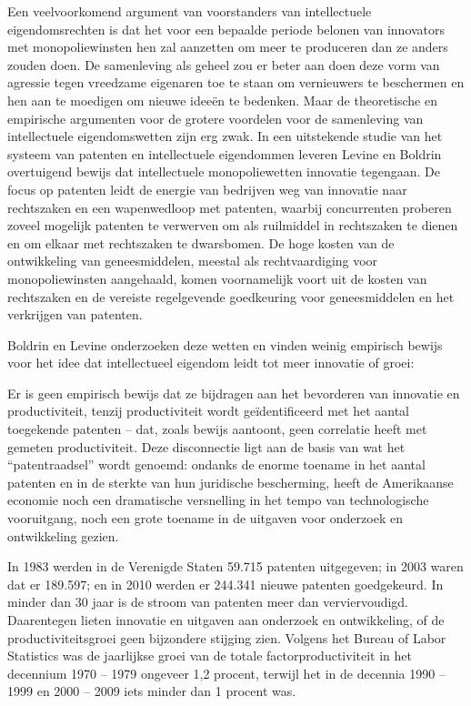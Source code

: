Een veelvoorkomend argument van voorstanders van intellectuele eigendomsrechten is dat het voor een bepaalde periode belonen van innovators met monopoliewinsten hen zal aanzetten om meer te produceren dan ze anders zouden doen. De samenleving als geheel zou er beter aan doen deze vorm van agressie tegen vreedzame eigenaren toe te staan om vernieuwers te beschermen en hen aan te moedigen om nieuwe ideeën te bedenken. Maar de theoretische en empirische argumenten voor de grotere voordelen voor de samenleving van intellectuele eigendomswetten zijn erg zwak. In een uitstekende studie van het systeem van patenten en intellectuele eigendommen leveren Levine en Boldrin overtuigend bewijs dat intellectuele monopoliewetten innovatie tegengaan. De focus op patenten leidt de energie van bedrijven weg van innovatie naar rechtszaken en een wapenwedloop met patenten, waarbij concurrenten proberen zoveel mogelijk patenten te verwerven om als ruilmiddel in rechtszaken te dienen en om elkaar met rechtszaken te dwarsbomen. De hoge kosten van de ontwikkeling van geneesmiddelen, meestal als rechtvaardiging voor monopoliewinsten aangehaald, komen voornamelijk voort uit de kosten van rechtszaken en de vereiste regelgevende goedkeuring voor geneesmiddelen en het verkrijgen van patenten.

Boldrin en Levine onderzoeken deze wetten en vinden weinig empirisch bewijs voor het idee dat intellectueel eigendom leidt tot meer innovatie of groei:

\begin{blockquotebox}
    Er is geen empirisch bewijs dat ze bijdragen aan het bevorderen van innovatie en productiviteit, tenzij productiviteit wordt geïdentificeerd met het aantal toegekende patenten -- dat, zoals bewijs aantoont, geen correlatie heeft met gemeten productiviteit. Deze disconnectie ligt aan de basis van wat het ``patentraadsel'' wordt genoemd: ondanks de enorme toename in het aantal patenten en in de sterkte van hun juridische bescherming, heeft de Amerikaanse economie noch een dramatische versnelling in het tempo van technologische vooruitgang, noch een grote toename in de uitgaven voor onderzoek en ontwikkeling gezien.
    \par\vspace{1em}\noindent
    In 1983 werden in de Verenigde Staten 59.715 patenten uitgegeven; in 2003 waren dat er 189.597; en in 2010 werden er 244.341 nieuwe patenten goedgekeurd. In minder dan 30 jaar is de stroom van patenten meer dan verviervoudigd. Daarentegen lieten innovatie en uitgaven aan onderzoek en ontwikkeling, of de productiviteitsgroei geen bijzondere stijging zien. Volgens het Bureau of Labor Statistics was de jaarlijkse groei van de totale factorproductiviteit in het decennium 1970 -- 1979 ongeveer 1,2 procent, terwijl het in de decennia 1990 -- 1999 en 2000 -- 2009 iets minder dan 1 procent was.\footnotemark
\end{blockquotebox}

